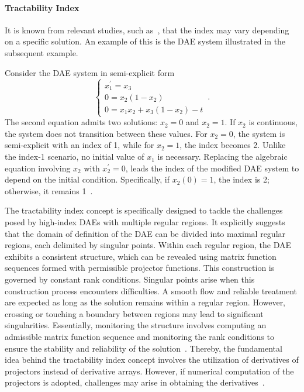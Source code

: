 \paragraph{Tractability Index}

It is known from relevant studies, such as~\cite{lamour2013differential}, that the index may vary depending on a specific solution. An example of this is the \ac{DAE} system illustrated in the subsequent example.

\begin{example}
  Consider the \ac{DAE} system in semi-explicit form
  \begin{equation*}
    \begin{cases}
    x_1^{\prime} = x_3 \\
    0 = x_2(1 - x_2) \\
    0 = x_1x_2 + x_3(1 - x_2) - t
    \end{cases} \, \text{.}
  \end{equation*}
  The second equation admits two solutions: $x_2 = 0$ and $x_2 = 1$. If $x_2$ is continuous, the system does not transition between these values. For $x_2 = 0$, the system is semi-explicit with an index of 1, while for $x_2 = 1$, the index becomes 2. Unlike the index-1 scenario, no initial value of $x_1$ is necessary. Replacing the algebraic equation involving $x_2$ with $x_2^{\prime} = 0$, leads the index of the modified \ac{DAE} system to depend on the initial condition. Specifically, if $x_2(0) = 1$, the index is 2; otherwise, it remains 1~\cite[Section 3.3]{lamour2013differential}.
\end{example}

The tractability index concept is specifically designed to tackle the challenges posed by high-index \acp{DAE} with multiple regular regions. It explicitly suggests that the domain of definition of the \ac{DAE} can be divided into maximal regular regions, each delimited by singular points. Within each regular region, the \ac{DAE} exhibits a consistent structure, which can be revealed using matrix function sequences formed with permissible projector functions. This construction is governed by constant rank conditions. Singular points arise when this construction process encounters difficulties. A smooth flow and reliable treatment are expected as long as the solution remains within a regular region. However, crossing or touching a boundary between regions may lead to significant singularities. Essentially, monitoring the structure involves computing an admissible matrix function sequence and monitoring the rank conditions to ensure the stability and reliability of the solution~\cite{lamour2011computational}. Thereby, the fundamental idea behind the tractability index concept involves the utilization of derivatives of projectors instead of derivative arrays. However, if numerical computation of the projectors is adopted, challenges may arise in obtaining the derivatives~\cite{mehrmann2015index}.

